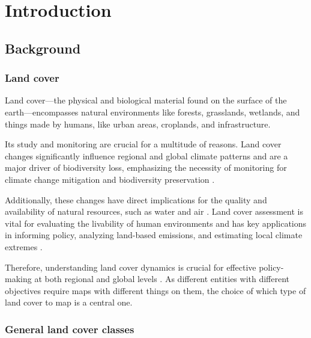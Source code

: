 \chapter[Introduction]{Introduction}
\label{cha:Chapter1}
\vspace*{\fill}


\newpage

\section{Background}


\subsection{Land cover}

    Land cover---the physical and biological material found on the surface of the earth---encompasses natural environments like forests, grasslands, wetlands, and things made by humans, like urban areas, croplands, and infrastructure. 
    
    Its study and monitoring are crucial for a multitude of reasons. Land cover changes significantly influence regional and global climate patterns and are a major driver of biodiversity loss, emphasizing the necessity of monitoring for climate change mitigation and biodiversity preservation \citep{pielke2002influence, houghton2012carbon, sala2000global, cbd2016indicators}. 
    
    Additionally, these changes have direct implications for the quality and availability of natural resources, such as water and air \citep{foley2005global}. Land cover assessment is vital for evaluating the livability of human environments \citep{krekel2016greener,levering2024landscape} and has key applications in informing policy, analyzing land-based emissions, and estimating local climate extremes \citep{duveiller2020, hong2021luemissions, sy2020,}. 

    Therefore, understanding land cover dynamics is crucial for effective policy-making at both regional and global levels \citep{liu2020assessing, trisurat2019land, shumba2020effectiveness}. As different entities with different objectives require maps with different things on them, the choice of which type of land cover to map is a central one. 

\subsection{General land cover classes}

